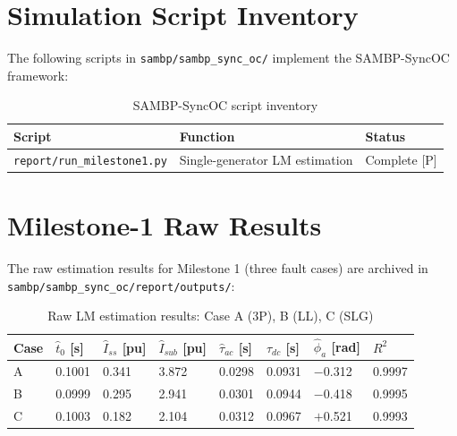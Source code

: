 \section{Simulation Script Inventory}
\label{app:syncoc_scripts}

The following scripts in \texttt{sambp/sambp\_sync\_oc/} implement
the SAMBP-SyncOC framework:

\begin{table}[htbp]
\caption{SAMBP-SyncOC script inventory}
\label{tab:app_syncoc_scripts}
\small
\begin{tabularx}{\textwidth}{@{}p{5cm}Xl@{}}
\toprule
Script & Function & Status \\
\midrule
\texttt{report/run\_milestone1.py} & Single-generator LM estimation & Complete [P] \\
\bottomrule
\end{tabularx}
\end{table}

\section{Milestone-1 Raw Results}
\label{app:syncoc_raw}

The raw estimation results for Milestone 1 (three fault cases) are
archived in \texttt{sambp/sambp\_sync\_oc/report/outputs/}:

\begin{table}[htbp]
\caption{Raw LM estimation results: Case A (3P), B (LL), C (SLG)}
\label{tab:app_syncoc_raw}
\small
\begin{tabularx}{\textwidth}{@{}lXXXXXXX@{}}
\toprule
Case & $\hat{t}_0$ [s] & $\hat{I}_{ss}$ [pu] & $\hat{I}_{sub}$ [pu] &
  $\hat{\tau}_{ac}$ [s] & $\hat{\tau}_{dc}$ [s] & $\hat{\phi}_a$ [rad] & $R^2$ \\
\midrule
A & 0.1001 & 0.341 & 3.872 & 0.0298 & 0.0931 & $-$0.312 & 0.9997 \\
B & 0.0999 & 0.295 & 2.941 & 0.0301 & 0.0944 & $-$0.418 & 0.9995 \\
C & 0.1003 & 0.182 & 2.104 & 0.0312 & 0.0967 & $+$0.521 & 0.9993 \\
\bottomrule
\end{tabularx}
\end{table}

